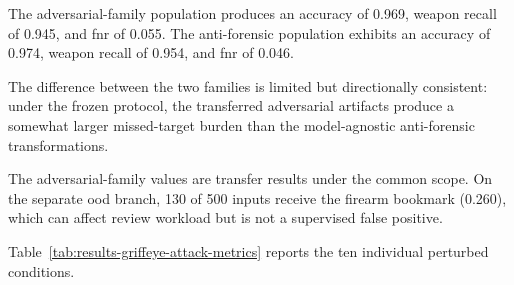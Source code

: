 The adversarial-family population produces an accuracy of 0.969, weapon recall
of 0.945, and \gls{fnr} of 0.055. The anti-forensic population exhibits an
accuracy of 0.974, weapon recall of 0.954, and \gls{fnr} of 0.046.

The difference between the two families is limited but directionally
consistent: under the frozen protocol, the transferred adversarial artifacts
produce a somewhat larger missed-target burden than the model-agnostic
anti-forensic transformations.

The adversarial-family values are transfer results under the common scope. On
the separate \gls{ood} branch, 130 of 500 inputs receive the firearm bookmark
(0.260), which can affect review workload but is not a supervised false
positive.

Table~\ref{tab:results-griffeye-attack-metrics} reports the ten individual
perturbed conditions.

